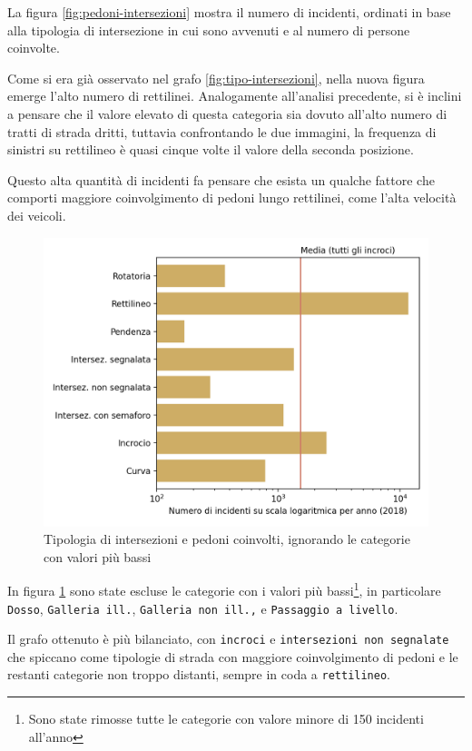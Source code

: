 \documentclass[a4paper,12pt]{report}
\newcommand{\columnstyle}[1]{\texttt{#1}}
\begin{document}
La figura \ref{fig:pedoni-intersezioni} mostra il numero di incidenti, 
ordinati in base alla tipologia di intersezione in cui sono avvenuti 
e al numero di persone coinvolte. 

Come si era già osservato nel grafo \ref{fig:tipo-intersezioni}, nella nuova 
figura emerge l'alto numero di rettilinei. 
Analogamente all'analisi precedente, si è inclini a pensare che il valore 
elevato di questa categoria sia dovuto all'alto 
numero di tratti di strada dritti, tuttavia confrontando le due immagini, 
la frequenza di sinistri su rettilineo è quasi cinque 
volte il valore della seconda posizione. 

Questo alta quantità di incidenti fa pensare che esista un qualche fattore 
che comporti maggiore coinvolgimento di pedoni lungo rettilinei, come 
l'alta velocità dei veicoli. 

\begin{figure}
    \includegraphics[width=\linewidth]{../src/incidenti/incidenti_senza_coords/pedoni/pedoni_log.png}
    \caption{Tipologia di intersezioni e pedoni coinvolti, ignorando le categorie con valori più bassi}
    \label{fig:pedoni-no-rett}
\end{figure}

In figura \ref{fig:pedoni-no-rett} sono state 
escluse le categorie con i valori 
più bassi\footnote{Sono state rimosse tutte le categorie con valore minore di 
150 incidenti all'anno}, 
in particolare \columnstyle{Dosso}, \columnstyle{Galleria ill.}, 
\columnstyle{Galleria non ill.,} e \columnstyle{Passaggio a livello}. 

Il grafo ottenuto è più bilanciato, con \columnstyle{incroci} e 
\columnstyle{intersezioni non segnalate} che spiccano come tipologie di strada con 
maggiore coinvolgimento di pedoni e le restanti categorie non troppo distanti, 
sempre in coda a \columnstyle{rettilineo}. 
\end{document}
